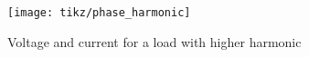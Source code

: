 \begin{figure}
	\centering
	\texttt{[image: tikz/phase\_harmonic]}
	\caption[Voltage and current for a load with higher harmonic]{Voltage and current for a load with higher harmonic}
	\label{fig:phase_harmonic}
\end{figure}
